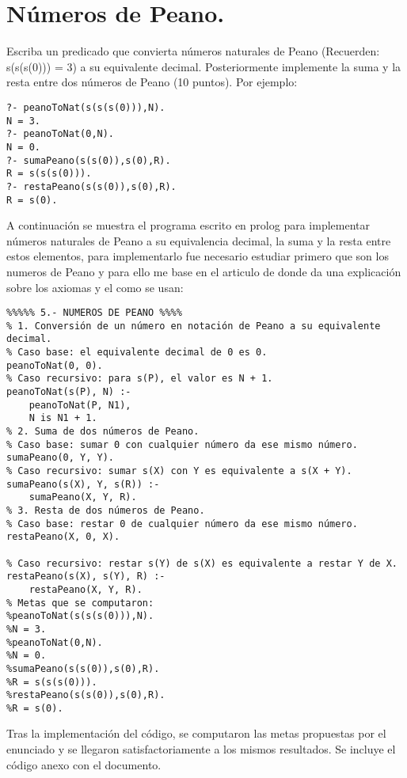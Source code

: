 \documentclass[11pt, letterpaper]{article}
\begin{document}
\newpage

\section{Números de Peano.}

Escriba un predicado que convierta números naturales de Peano (Recuerden: s(s(s(0))) = 3) a su equivalente decimal. Posteriormente implemente la suma y la resta entre dos números de Peano (10 puntos). Por ejemplo:

\begin{lstlisting}
?- peanoToNat(s(s(s(0))),N).
N = 3.
?- peanoToNat(0,N).
N = 0.
?- sumaPeano(s(s(0)),s(0),R).
R = s(s(s(0))).
?- restaPeano(s(s(0)),s(0),R).
R = s(0).
\end{lstlisting} 

A continuación se muestra el programa escrito en prolog para implementar números naturales de Peano a su equivalencia decimal, la suma y la resta entre estos elementos, para implementarlo fue necesario estudiar primero que son los numeros de Peano y para ello me base en el articulo de \cite{peano2019} donde da una explicación sobre los axiomas y el como se usan:

\begin{lstlisting}
%%%%% 5.- NUMEROS DE PEANO %%%%
% 1. Conversión de un número en notación de Peano a su equivalente decimal.
% Caso base: el equivalente decimal de 0 es 0.
peanoToNat(0, 0).
% Caso recursivo: para s(P), el valor es N + 1.
peanoToNat(s(P), N) :-
    peanoToNat(P, N1),
    N is N1 + 1.
% 2. Suma de dos números de Peano.
% Caso base: sumar 0 con cualquier número da ese mismo número.
sumaPeano(0, Y, Y).
% Caso recursivo: sumar s(X) con Y es equivalente a s(X + Y).
sumaPeano(s(X), Y, s(R)) :-
    sumaPeano(X, Y, R).
% 3. Resta de dos números de Peano.
% Caso base: restar 0 de cualquier número da ese mismo número.
restaPeano(X, 0, X).

% Caso recursivo: restar s(Y) de s(X) es equivalente a restar Y de X.
restaPeano(s(X), s(Y), R) :-
    restaPeano(X, Y, R).
% Metas que se computaron:
%peanoToNat(s(s(s(0))),N).
%N = 3.
%peanoToNat(0,N).
%N = 0.
%sumaPeano(s(s(0)),s(0),R).
%R = s(s(s(0))).
%restaPeano(s(s(0)),s(0),R).
%R = s(0).
\end{lstlisting} 

Tras la implementación del código, se computaron las metas propuestas por el enunciado y se llegaron satisfactoriamente a los mismos resultados. Se incluye el código anexo con el documento.




\newpage




\end{document}

